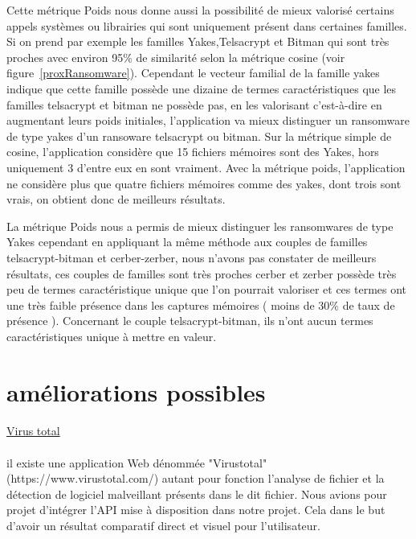 \documentclass[a4paper, 12pt]{book}
\begin{document}
Cette métrique Poids nous donne aussi la possibilité de mieux valorisé certains appels systèmes ou librairies qui sont uniquement présent dans certaines familles. Si on prend par exemple les familles Yakes,Telsacrypt et Bitman qui sont très proches avec environ 95\% de similarité selon la métrique cosine (voir figure~\ref{proxRansomware}). Cependant le vecteur familial de la famille yakes indique que cette famille possède une dizaine de termes caractéristiques que les familles telsacrypt et bitman ne possède pas, en les valorisant c'est-à-dire en augmentant leurs poids initiales, l'application va mieux distinguer un ransomware de type yakes d'un ransoware telsacrypt ou bitman. Sur la métrique simple de cosine, l'application considère que 15 fichiers mémoires sont des Yakes, hors uniquement 3 d’entre eux en sont vraiment. Avec la métrique poids, l'application ne considère plus que quatre fichiers mémoires comme des yakes, dont trois sont vrais, on obtient donc de meilleurs résultats.

La métrique Poids nous a permis de mieux distinguer les ransomwares de type Yakes cependant en appliquant la même méthode aux couples de familles 
telsacrypt-bitman et cerber-zerber, nous n'avons pas constater de meilleurs résultats, ces couples de familles sont très proches cerber et zerber possède très peu de termes caractéristique unique que l'on pourrait valoriser et ces termes ont une très faible présence dans les captures mémoires ( moins de 30\% de taux de présence ). Concernant le couple telsacrypt-bitman, ils n'ont aucun termes caractéristiques unique à mettre en valeur.

\newpage
\section{améliorations possibles}
\paragraph{}
\underline{Virus total}


\paragraph{}
il existe une application Web dénommée "Virustotal" (https://www.virustotal.com/) autant pour fonction l'analyse de fichier et la détection de logiciel malveillant présents dans le dit fichier. Nous avions pour projet d'intégrer l'API mise à disposition dans notre projet. Cela dans le but d'avoir un résultat comparatif direct et visuel pour l'utilisateur.
\end{document}
